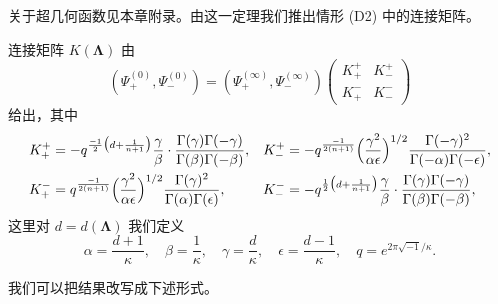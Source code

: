 
关于超几何函数见本章附录。由这一定理我们推出情形 (D2) 中的连接矩阵。

\begin{corollary}[6.24]
连接矩阵 $K(\mathbf{\Lambda})$ 由
\[
(\Psi_+^{(0)},\Psi_-^{(0)})
=(\Psi_+^{(\infty)},\Psi_-^{(\infty)})
\begin{pmatrix}
K_+^+ & K_-^+\\
K_+^- & K_-^-
\end{pmatrix}
\]
给出，其中
\[
\begin{aligned}
K_+^+&=-q^{\frac{-1}{2}\bigl(d+\frac{1}{n+1}\bigr)}
\frac{\gamma}{\beta}\cdot\frac{\Gamma(\gamma)\Gamma(-\gamma)}
{\Gamma(\beta)\Gamma(-\beta)},&
K_-^+&=-q^{\frac{-1}{2(n+1)}}\Bigl(\frac{\gamma^2}{\alpha\epsilon}\Bigr)^{1/2}
\frac{\Gamma(-\gamma)^2}{\Gamma(-\alpha)\Gamma(-\epsilon)},\\
K_+^-&=q^{\frac{-1}{2(n+1)}}\Bigl(\frac{\gamma^2}{\alpha\epsilon}\Bigr)^{1/2}
\frac{\Gamma(\gamma)^2}{\Gamma(\alpha)\Gamma(\epsilon)},&
K_-^-&=-q^{\frac{1}{2}\bigl(d+\frac{1}{n+1}\bigr)}
\frac{\gamma}{\beta}\cdot\frac{\Gamma(\gamma)\Gamma(-\gamma)}
{\Gamma(\beta)\Gamma(-\beta)},
\end{aligned}
\]
这里对 $d=d(\mathbf{\Lambda})$ 我们定义
\[
\alpha=\frac{d+1}{\kappa},\quad\beta=\frac{1}{\kappa},\quad
\gamma=\frac{d}{\kappa},\quad\epsilon=\frac{d-1}{\kappa},\quad
q=e^{2\pi\sqrt{-1}/\kappa}.
\]
\end{corollary}

我们可以把结果改写成下述形式。

